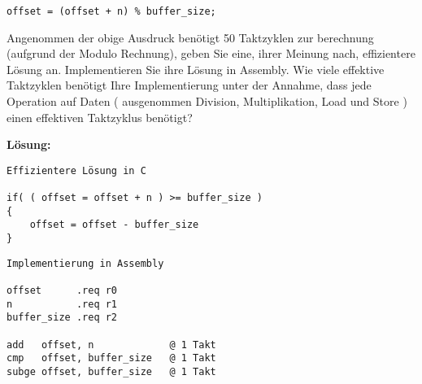 \documentclass[12pt]{article}
\begin{document}
\begin{lstlisting}
offset = (offset + n) % buffer_size;
\end{lstlisting}

Angenommen der obige Ausdruck benötigt 50 Taktzyklen zur berechnung (aufgrund
der Modulo Rechnung), geben Sie
eine, ihrer Meinung nach, effizientere Lösung an. Implementieren Sie ihre Lösung
in Assembly. Wie viele effektive Taktzyklen benötigt Ihre Implementierung unter
der Annahme, dass jede Operation auf Daten ( ausgenommen Division,
Multiplikation, Load und Store ) einen effektiven Taktzyklus benötigt?

\textbf{Lösung:}
\begin{lstlisting}
Effizientere Lösung in C

if( ( offset = offset + n ) >= buffer_size )
{
    offset = offset - buffer_size 
}
\end{lstlisting}

\begin{lstlisting}
Implementierung in Assembly

offset      .req r0
n           .req r1
buffer_size .req r2

add   offset, n             @ 1 Takt
cmp   offset, buffer_size   @ 1 Takt
subge offset, buffer_size   @ 1 Takt
\end{lstlisting}
\end{document}
